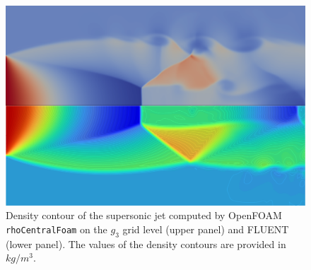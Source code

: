 \documentclass[12pt]{article}
\begin{document}
\begin{figure}[H]
    \centering
    \includegraphics[width=0.925\linewidth]{figs/stacked_rho_OFg3_vs_FLUENT.png}
    \caption{Density contour of the supersonic jet computed by OpenFOAM \texttt{rhoCentralFoam} on the $g_3$ grid level (upper panel) and FLUENT (lower panel). The values of the density contours are provided in $kg/m^3$.}
    \label{fig:rho_OFg3_vs_FLUENT}
\end{figure}
\end{document}
